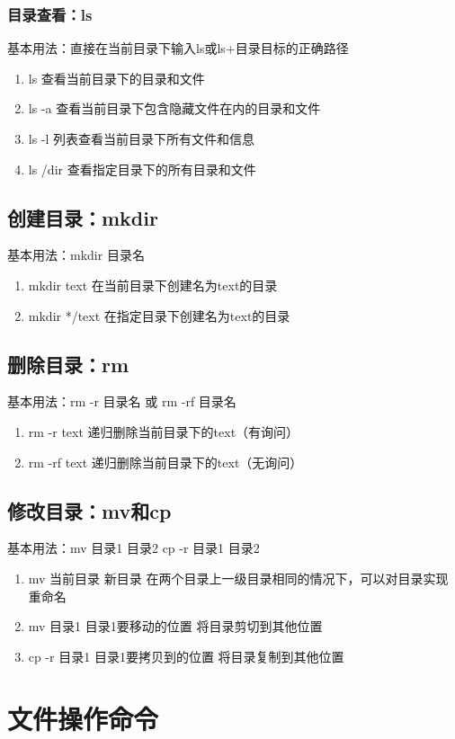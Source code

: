 \documentclass{notebook}
\begin{document}
\subsection{目录查看：ls}
基本用法：直接在当前目录下输入ls或ls+目录目标的正确路径
\begin{enumerate}
    \item ls 查看当前目录下的目录和文件
    \item ls -a 查看当前目录下包含隐藏文件在内的目录和文件
    \item ls -l 列表查看当前目录下所有文件和信息
    \item ls /dir 查看指定目录下的所有目录和文件
\end{enumerate}
\section{创建目录：mkdir}
基本用法：mkdir 目录名
\begin{enumerate}
    \item mkdir text 在当前目录下创建名为text的目录
    \item mkdir */text 在指定目录下创建名为text的目录
\end{enumerate}
\section{删除目录：rm}
基本用法：rm -r 目录名 或 rm -rf 目录名
\begin{enumerate}
    \item rm -r text 递归删除当前目录下的text（有询问）
    \item rm -rf text 递归删除当前目录下的text（无询问）
\end{enumerate}
\section{修改目录：mv和cp}
基本用法：mv 目录1 目录2 cp -r 目录1 目录2
\begin{enumerate}
    \item mv 当前目录 新目录 在两个目录上一级目录相同的情况下，可以对目录实现重命名
    \item mv 目录1 目录1要移动的位置 将目录剪切到其他位置
    \item cp -r 目录1 目录1要拷贝到的位置 将目录复制到其他位置
\end{enumerate}

\chapter{文件操作命令}
\end{document}
